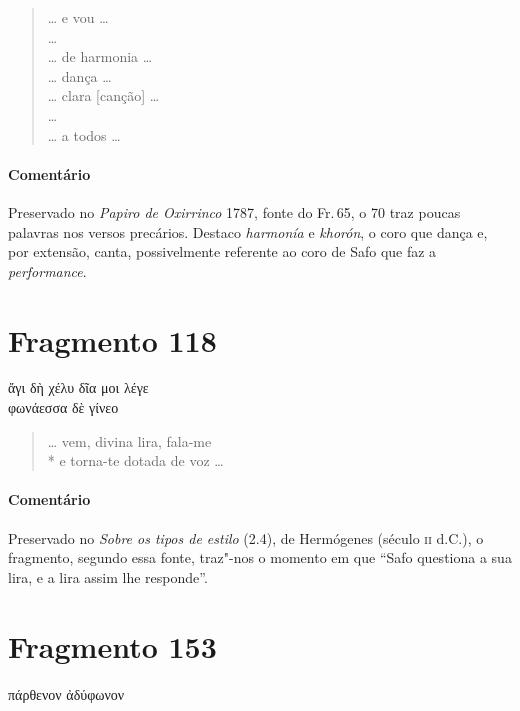 \begin{verse}
\ldots{} e vou \ldots{}\\
\ldots{}\\
\ldots{} de harmonia \ldots{}\\
\ldots{} dança \ldots{}\\
\ldots{} clara [canção] \ldots{}\\
\ldots{}\\
\ldots{} a todos \ldots{} 
\end{verse}


{\paragraph{Comentário} Preservado no \textit{Papiro de Oxirrinco} 1787, fonte do Fr.\,65, o 70 traz poucas palavras nos versos precários. Destaco \textit{harmonía} e \textit{khorón}, o coro que dança e, por extensão, canta, possivelmente referente ao coro de Safo que faz a \textit{performance}.}

\pagebreak
\section{Fragmento 118}

\begin{gkverse}
ἄγι δὴ χέλυ δῖα \dagger{}μοι λέγε\dagger{}\\
φωνάεσσα \dagger{}δὲ γίνεο\dagger{}
\end{gkverse}

\begin{verse}
\ldots{} vem, divina lira, fala-me\\*
e torna-te dotada de voz \ldots{}
\end{verse}

\medskip

{\paragraph{Comentário} Preservado no \textit{Sobre os tipos de estilo} (2.4), de Hermógenes (século \textsc{ii} d.C.),
o fragmento, segundo essa fonte, traz"-nos o momento em que ``Safo
questiona a sua lira, e a lira assim lhe responde''.}


\section{Fragmento 153}

\begin{gkverse}
πάρθενον ἀδύφωνον
\end{gkverse}

